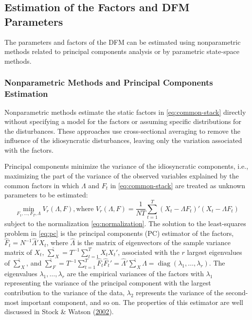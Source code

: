 \documentclass[12pt,twoside]{reedthesis}
\begin{document}
\hypertarget{estimation-of-the-factors-and-dfm-parameters}{%
\subsection{Estimation of the Factors and DFM Parameters}\label{estimation-of-the-factors-and-dfm-parameters}}

The parameters and factors of the DFM can be estimated using nonparametric methods related to principal components analysis or by parametric state-space methods.

\hypertarget{nonparametric-methods-and-principal-components-estimation}{%
\subsubsection{Nonparametric Methods and Principal Components Estimation}\label{nonparametric-methods-and-principal-components-estimation}}

Nonparametric methods estimate the static factors in \eqref{eq:common-stack} directly without specifying a model for the factors or assuming specific distributions for the disturbances. These approaches use cross-sectional averaging to remove the influence of the idiosyncratic disturbances, leaving only the variation associated with the factors.

Principal components minimize the variance of the idiosyncratic components, i.e., maximizing the part of the variance of the observed variables explained by the common factors in which \(\Lambda\) and \(F_{t}\) in \eqref{eq:common-stack} are treated as unknown parameters to be estimated:
\begin{equation}
  \min_{F_{1}, \ldots, F_{T}, \Lambda} V_{r}(\Lambda, F), \text{where } V_{r}(\Lambda, F) = \frac{1}{NT} \sum_{t = 1}^{T} (X_{t} - \Lambda F_{t})'(X_{t} - \Lambda F_{t}) \label{eq:pc}
\end{equation}
subject to the normalization \eqref{eq:normalization}. The solution to the least-squares problem in \eqref{eq:pc} is the principal components (PC) estimator of the factors, \(\hat{F}_{t} = N^{-1} \hat{\Lambda}' X_{t}\), where \(\hat{\Lambda}\) is the matrix of eigenvectors of the sample variance matrix of \(X_{t}\), \(\hat{\sum}_{X} = T^{-1} \sum_{t = 1}^{T} X_{t}X_{t}'\), associated with the \(r\) largest eigenvalues of \(\hat{\sum}_{X}\), and \(\hat {\sum}_{F} = T^{-1} \sum_{t = 1}^{T} \hat{F}_{t} \hat{F}_{t}' = \hat{\Lambda}' \hat{\sum}_{X} \hat{\Lambda} = \mathop\mathrm{diag}(\lambda_{1}, \ldots, \lambda_{r})\). The eigenvalues \(\lambda_{1}, \ldots, \lambda_{r}\) are the empirical variances of the factors with \(\lambda_{1}\) representing the variance of the principal component with the largest contribution to the variance of the data, \(\lambda_{2}\) represents the variance of the second-most important component, and so on. The properties of this estimator are well discussed in Stock \& Watson (\protect\hyperlink{ref-stocwats:2002}{2002}).
\end{document}
